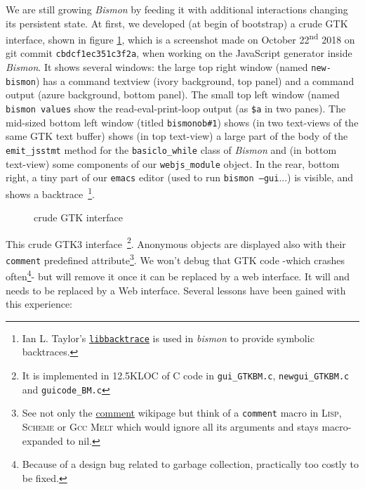 We are still growing \emph{Bismon} by feeding it with additional
interactions changing its persistent state. At first, we developed (at
begin of bootstrap) a crude GTK interface,
shown in figure \ref{fig:bismonscreenshot-cbdcf}, which is a
screenshot made on October 22\textsuperscript{nd} 2018 on git commit
\texttt{cbdcf1ec351c3f2a}, when working on the JavaScript generator
inside \emph{Bismon}. It shows several windows: the large top right
window (named \texttt{new-bismon}) has a command textview (ivory
background, top panel) and a command output (azure background, bottom
panel). The small top left window (named \texttt{bismon values} show
the read-eval-print-loop output (as \texttt{\$a} in two panes). The
mid-sized bottom left window (titled \texttt{bismonob\#1}) shows (in
two text-views of the same GTK text buffer) shows (in top text-view) a
large part of the body of the \texttt{emit\_jsstmt} method for the
\texttt{basiclo\_while} class of \emph{Bismon} and (in bottom
text-view) some components of our \texttt{webjs\_module} object. In
the rear, bottom right, a tiny part of our \texttt{emacs} editor (used
to run \texttt{bismon --gui}...) is visible, and shows a
backtrace~\footnote{Ian L. Taylor's
  \href{https://github.com/ianlancetaylor/libbacktrace}{\texttt{libbacktrace}}
  is used in \emph{bismon} to provide symbolic backtraces.}.


\begin{figure}[h]
  \begin{center}
  \end{center}
  \caption{crude {} GTK interface
    {}}
  \label{fig:bismonscreenshot-cbdcf}
\end{figure}

This crude GTK3 interface~\footnote{It is implemented in 12.5KLOC of C
code in \texttt{gui\_GTKBM.c}, \texttt{newgui\_GTKBM.c} and
\texttt{guicode\_BM.c}}. Anonymous objects are displayed also with
their  \texttt{comment} predefined
attribute\footnote{See not only the
\href{https://en.wikipedia.org/wiki/Comment\_(computer\_programming)}{comment}
wikipage but think of a \texttt{comment} macro in \textsc{Lisp},
\textsc{Scheme} or \textsc{Gcc Melt} which would ignore all its
arguments and stays macro-expanded to nil.}. We won't debug that GTK
code -which crashes often\footnote{Because of a design bug related to
garbage collection, practically too costly to be fixed.}- but will
remove it once it can be replaced by a web interface. It will and
needs to be replaced by a Web interface. Several lessons have been
gained with this experience:

